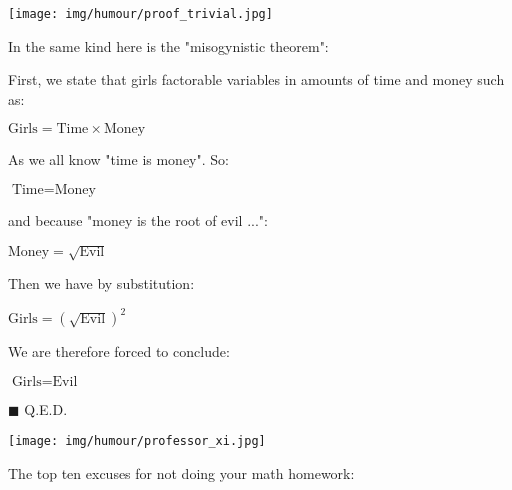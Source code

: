 	\begin{center}
		\texttt{[image: img/humour/proof\_trivial.jpg]}	
	\end{center}
	
	\begin{center}\underline{\hspace{5 cm}}\end{center}	
	
In the same kind here is the "misogynistic theorem":

First, we state that girls factorable variables in amounts of time and money such as:

\begin{center}
$\text{Girls}=\text{Time}\times\text{Money}$
\end{center}

As we all know "time is money". So:

\begin{center}
$\text{Time}=\text{Money}$
\end{center}

and because "money is the root of evil ...":

\begin{center}
$\text{Money}=\sqrt{\text{Evil}}$
\end{center}

Then we have by substitution:

\begin{center}
$\text{Girls}=\left(\sqrt{\text{Evil}}\right)^2$
\end{center}

We are therefore forced to conclude:

\begin{center}
$\text{Girls}=\text{Evil}$
\end{center}

	\begin{flushright}
		$\blacksquare$  Q.E.D.
	\end{flushright}
	
	\begin{center}\underline{\hspace{5 cm}}\end{center}
	\begin{center}
		\texttt{[image: img/humour/professor\_xi.jpg]}	
	\end{center}
	
	The top ten excuses for not doing your math homework:
	
